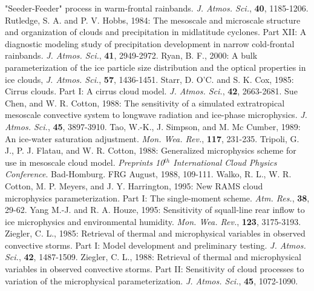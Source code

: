       "Seeder-Feeder" process in warm-frontal rainbands.
      {\it J. Atmos. Sci.},
      {\bf 40},
      1185-1206.
\decrefname
Rutledge, S. A. and P. V. Hobbs, 1984:
      The mesoscale and microscale structure and organization of clouds and
      precipitation in midlatitude cyclones. Part XII: A diagnostic modeling
      study of precipitation development in narrow cold-frontal rainbands.
      {\it J. Atmos. Sci.},
      {\bf 41},
      2949-2972.
\decrefname
Ryan, B. F., 2000: A bulk parameterization of the ice particle size
      distribution and the optical properties in ice clouds,
      {\it J. Atmos. Sci.}, {\bf 57}, 1436-1451.
\decrefname
Starr, D. O'C. and S. K. Cox, 1985:
      Cirrus clouds. Part I: A cirrus cloud model.
      {\it J. Atmos. Sci.},
      {\bf 42},
      2663-2681.
\decrefname
Sue Chen, and W. R. Cotton, 1988:
      The sensitivity of a simulated extratropical mesoscale convective system
      to longwave radiation and ice-phase microphysics.
      {\it J. Atmos. Sci.},
      {\bf 45},
      3897-3910.
\decrefname
Tao, W.-K., J. Simpson, and M. Mc Cumber, 1989:
      An ice-water saturation adjustment.
      {\it Mon. Wea. Rev.},
      {\bf 117},
      231-235.
\decrefname
Tripoli, G. J., P. J. Flatau, and W. R. Cotton, 1988:
      Generalized microphysics scheme for use in mesoscale cloud model.
      {\it Preprints 10$^{th}$ International Cloud Physics Conference}.
      Bad-Homburg. FRG August, 1988,
      109-111.
\decrefname
Walko, R. L., W. R. Cotton, M. P. Meyers, and J. Y. Harrington, 1995:
      New RAMS cloud microphysics parameterization. Part I: The single-moment
      scheme.
      {\it Atm. Res.},
      {\bf 38},
      29-62.
\decrefname
Yang M.-J. and R. A. Houze, 1995:
      Sensitivity of squall-line rear inflow to ice microphysics and
      environmental humidity.
      {\it Mon. Wea. Rev.},
      {\bf 123},
      3175-3193.
\decrefname
Ziegler, C. L., 1985:
      Retrieval of thermal and microphysical variables in observed convective
      storms. Part I: Model development and preliminary testing.
      {\it J. Atmos. Sci.},
      {\bf 42},
      1487-1509.
\decrefname
Ziegler, C. L., 1988:
      Retrieval of thermal and microphysical variables in observed convective
      storms. Part II: Sensitivity of cloud processes to variation of the
      microphysical parameterization.
      {\it J. Atmos. Sci.},
      {\bf 45},
      1072-1090.
\decrefname

%



